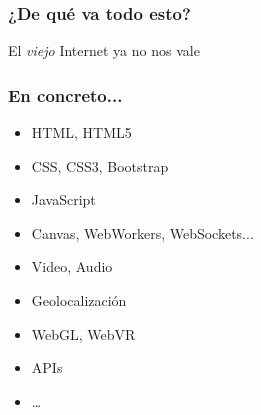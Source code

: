 \begin{frame}
\frametitle{¿De qué va todo esto?}

\vspace{3cm}

\begin{center}
\Huge El \emph{viejo} Internet ya no nos vale
\end{center}

\end{frame}
\usebackgroundtemplate{}



\begin{frame}
\frametitle{En concreto...}


\begin{itemize}
\item HTML, HTML5
\item CSS, CSS3, Bootstrap
\item JavaScript
\item Canvas, WebWorkers, WebSockets...
\item Video, Audio
\item Geolocalización
\item WebGL, WebVR
\item APIs
\item \dots
\end{itemize}


\end{frame}


